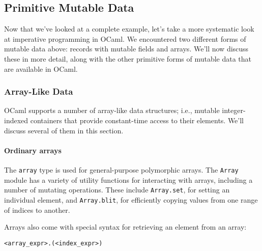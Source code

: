 \hypertarget{primitive-mutable-data}{%
\subsection{Primitive Mutable Data}\label{primitive-mutable-data}}

Now that we've looked at a complete example, let's take a more
systematic look at imperative programming in OCaml. We encountered two
different forms of mutable data above: records with mutable fields and
arrays. We'll now discuss these in more detail, along with the other
primitive forms of mutable data that are available in OCaml.

\hypertarget{array-like-data}{%
\subsubsection{Array-Like Data}\label{array-like-data}}

OCaml supports a number of array-like data structures; i.e., mutable
integer-indexed containers that provide constant-time access to their
elements. We'll discuss several of them in this section.

\hypertarget{ordinary-arrays}{%
\paragraph{Ordinary arrays}\label{ordinary-arrays}}

The \passthrough{\lstinline!array!} type is used for general-purpose
polymorphic arrays. The \passthrough{\lstinline!Array!} module has a
variety of utility functions for interacting with arrays, including a
number of mutating operations. These include
\passthrough{\lstinline!Array.set!}, for setting an individual element,
and \passthrough{\lstinline!Array.blit!}, for efficiently copying values
from one range of indices to another. 

Arrays also come with special syntax for retrieving an element from an
array:

\begin{lstlisting}
<array_expr>.(<index_expr>)
\end{lstlisting}

